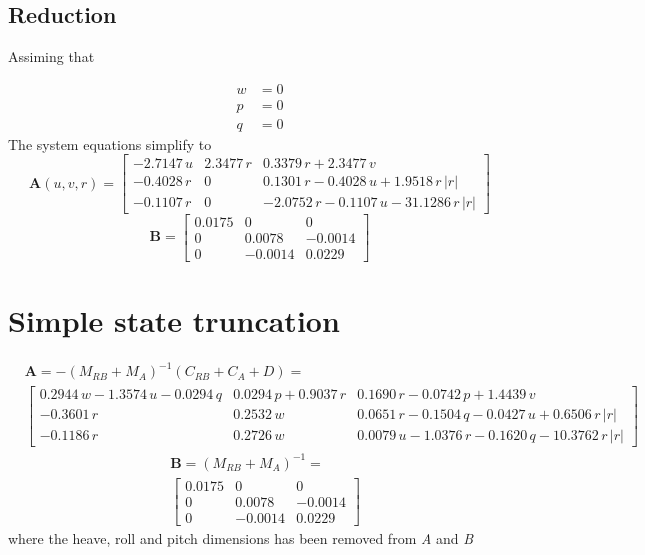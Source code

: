 \documentclass[12pt,a4]{article}
\begin{document}
\subsection{Reduction}

Assiming that

\begin{align*}
	w & = 0 \\
	p & = 0 \\
	q & = 0
\end{align*}
The system equations simplify to
\begin{equation}
	\bm{A}(u,v,r) = \left[\begin{array}{ccc} -2.7147\,u & 2.3477\,r & 0.3379\,r+2.3477\,v                             \\
			-0.4028\,r       & 0         & 0.1301\,r-0.4028\,u+			1.9518\,r\,\left|r\right|   \\
			-0.1107\,r       & 0         & -2.0752\,r-0.1107\,u-		31.1286\,r\,\left|r\right|\end{array}\right]
\end{equation}
\begin{equation}
	\bm{B} = \left[\begin{array}{ccc} 0.0175 & 0 & 0\\ 0 & 0.0078 & -0.0014\\ 0 & -0.0014 & 0.0229 \end{array}\right]
\end{equation}
\section{Simple state truncation}
\begin{align*}
	 & \bm{A} =  -(M_{RB} + M_A)^{-1}(C_{RB}+C_A+D)= \\
	 & \left[\begin{array}{ccc} 0.2944\,w-1.3574\,u-0.0294\,q & 0.0294\,p+0.9037\,r & 0.1690\,r-0.0742\,p+1.4439\,v\\ -0.3601\,r & 0.2532\,w & 0.0651\,r-0.1504\,q-0.0427\,u+0.6506\,r\,\left|r\right|\\ -0.1186\,r & 0.2726\,w & 0.0079\,u-1.0376\,r-0.1620\,q-10.3762\,r\,\left|r\right| \end{array}\right]
\end{align*}
\begin{align*}
	 & \bm{B} = (M_{RB} + M_A)^{-1}=           \\
	 & \left[\begin{array}{ccc} 0.0175 & 0 & 0\\ 0 & 0.0078 & -0.0014\\ 0 & -0.0014 & 0.0229 \end{array}\right]
\end{align*}
where the heave, roll and pitch dimensions has been removed from \textit{A} and \textit{B}
\end{document}
